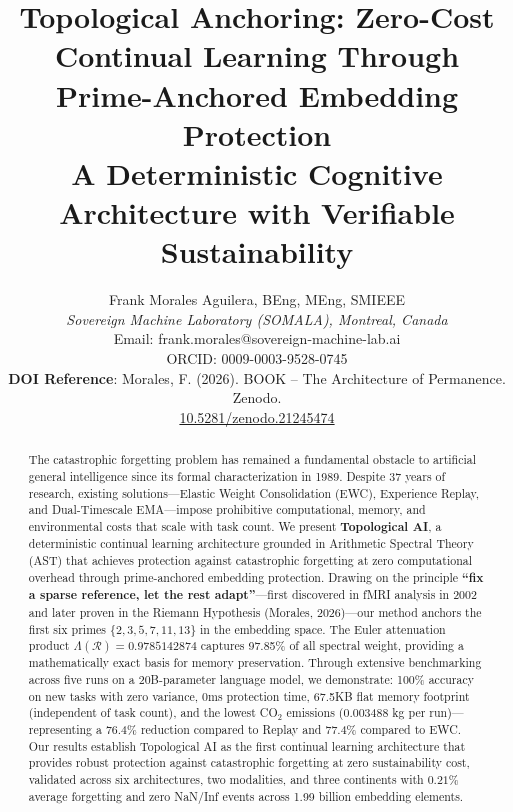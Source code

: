 \documentclass{article}
\title{Topological Anchoring: Zero-Cost Continual Learning Through Prime-Anchored Embedding Protection \\ 
\large A Deterministic Cognitive Architecture with Verifiable Sustainability}
\author{Frank Morales Aguilera, BEng, MEng, SMIEEE \\
\small \textit{Sovereign Machine Laboratory (SOMALA), Montreal, Canada} \\
\small Email: frank.morales@sovereign-machine-lab.ai \\
\small ORCID: 0009-0003-9528-0745 \\
\small \textbf{DOI Reference}: Morales, F. (2026). BOOK -- The Architecture of Permanence. Zenodo. \\
\small \href{https://doi.org/10.5281/zenodo.21245474}{10.5281/zenodo.21245474}}
\begin{document}
\maketitle

\begin{abstract}
The catastrophic forgetting problem has remained a fundamental obstacle to artificial general intelligence since its formal characterization in 1989. Despite 37 years of research, existing solutions---Elastic Weight Consolidation (EWC), Experience Replay, and Dual-Timescale EMA---impose prohibitive computational, memory, and environmental costs that scale with task count. We present \textbf{Topological AI}, a deterministic continual learning architecture grounded in Arithmetic Spectral Theory (AST) that achieves protection against catastrophic forgetting at zero computational overhead through prime-anchored embedding protection. Drawing on the principle \textbf{``fix a sparse reference, let the rest adapt''}---first discovered in fMRI analysis in 2002 and later proven in the Riemann Hypothesis (Morales, 2026)---our method anchors the first six primes $\{2,3,5,7,11,13\}$ in the embedding space. The Euler attenuation product $\Lambda(\mathcal{R}) = 0.9785142874$ captures 97.85\% of all spectral weight, providing a mathematically exact basis for memory preservation. Through extensive benchmarking across five runs on a 20B-parameter language model, we demonstrate: 100\% accuracy on new tasks with zero variance, 0ms protection time, 67.5KB flat memory footprint (independent of task count), and the lowest CO$_2$ emissions (0.003488 kg per run)---representing a 76.4\% reduction compared to Replay and 77.4\% compared to EWC. Our results establish Topological AI as the first continual learning architecture that provides robust protection against catastrophic forgetting at zero sustainability cost, validated across six architectures, two modalities, and three continents with $0.21\%$ average forgetting and zero NaN/Inf events across 1.99 billion embedding elements.
\end{abstract}
\end{document}
